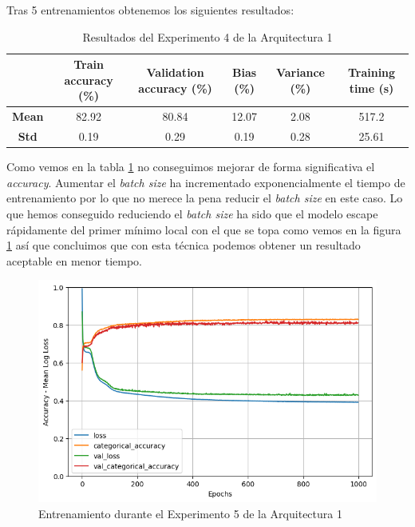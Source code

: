 \documentclass{article}
\begin{document}
			Tras 5 entrenamientos obtenemos los siguientes resultados:\\
			\begin{table}[!h]
				\begin{center}
					\begin{tabular}{ c | c | c | c | c | c |}
						\ & \textbf{Train accuracy (\%)} & \textbf{Validation accuracy (\%)} & \textbf{Bias (\%)} & \textbf{Variance (\%)} & \textbf{Training time (s)} \\ \hline
						\textbf{Mean} & 82.92 & 80.84 & 12.07 & 2.08 & 517.2\\ \hline
						\textbf{Std} & 0.19 & 0.29 & 0.19 & 0.28 & 25.61 \\ \hline
					\end{tabular}
					\caption{Resultados del Experimento 4 de la Arquitectura 1}
					\label{tab:res-d-a1-e5}
				\end{center}
			\end{table}
			Como vemos en la tabla \ref{tab:res-d-a1-e5} no conseguimos mejorar de forma significativa el \textit{accuracy}. Aumentar el \textit{batch size} ha incrementado exponencialmente el tiempo de entrenamiento por lo que no merece la pena reducir el \textit{batch size} en este caso. Lo que hemos conseguido reduciendo el \textit{batch size} ha sido que el modelo escape r\'apidamente del primer m\'inimo local con el que se topa como vemos en la figura \ref{d-tr-a1-e5} as\'i que concluimos que con esta t\'ecnica podemos obtener un resultado aceptable en menor tiempo.
			\begin{figure}[!h]
				\begin{center}
					\includegraphics[scale=0.5]{d-tr-a1-e5.png}		
					\caption{Entrenamiento durante el Experimento 5 de la Arquitectura 1}	
					\label{d-tr-a1-e5}
				\end{center}
			\end{figure}
			
\end{document}
